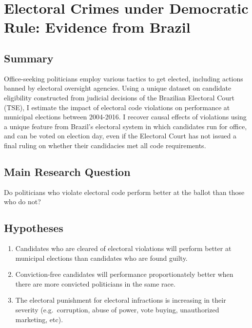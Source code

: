 \documentclass[]{article}
\title{}
\author{}
\date{}
\begin{document}
\hypertarget{title1}{%
\section{Electoral Crimes under Democratic Rule: Evidence from
Brazil}\label{title1}}

\hypertarget{summary}{%
\subsection{Summary}\label{summary}}

Office-seeking politicians employ various tactics to get elected,
including actions banned by electoral oversight agencies. Using a unique
dataset on candidate eligibility constructed from judicial decisions of
the Brazilian Electoral Court (TSE), I estimate the impact of electoral
code violations on performance at municipal elections between 2004-2016.
I recover causal effects of violations using a unique feature from
Brazil's electoral system in which candidates run for office, and can be
voted on election day, even if the Electoral Court has not issued a
final ruling on whether their candidacies met all code requirements.

\hypertarget{main-research-question}{%
\subsection{Main Research Question}\label{main-research-question}}

Do politicians who violate electoral code perform better at the ballot
than those who do not?

\hypertarget{hypotheses}{%
\subsection{Hypotheses}\label{hypotheses}}

\begin{enumerate}
\item
  Candidates who are cleared of electoral violations will perform better
  at municipal elections than candidates who are found guilty.
\item
  Conviction-free candidates will performance proportionately better
  when there are more convicted politicians in the same race.
\item
  The electoral punishment for electoral infractions is increasing in
  their severity (e.g.~corruption, abuse of power, vote buying,
  unauthorized marketing, etc).
\end{enumerate}
\end{document}
